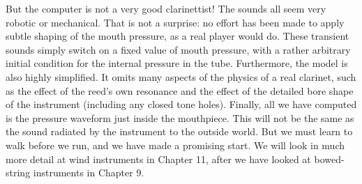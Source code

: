   But the computer is not a very good clarinettist! The sounds all seem very 
  robotic or mechanical. That is not a surprise: no effort has been made to 
  apply subtle shaping of the mouth pressure, as a real player would do. These 
  transient sounds simply switch on a fixed value of mouth pressure, with a 
  rather arbitrary initial condition for the internal pressure in the tube. 
  Furthermore, the model is also highly simplified. It omits many aspects of 
  the physics of a real clarinet, such as the effect of the reed's own 
  resonance and the effect of the detailed bore shape of the instrument 
  (including any closed tone holes). Finally, all we have computed is the 
  pressure waveform just inside the mouthpiece. This will not be the same as 
  the sound radiated by the instrument to the outside world. But we must learn 
  to walk before we run, and we have made a promising start. We will look in 
  much more detail at wind instruments in Chapter 11, after we have looked at 
  bowed-string instruments in Chapter 9. 

